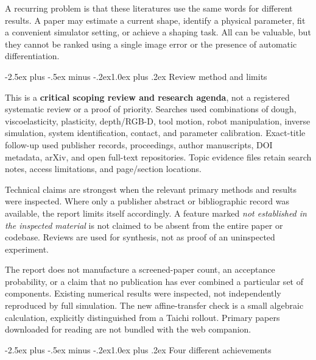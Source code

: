 \documentclass[
  11pt,
]{article}
\makeatletter
\renewcommand\subsection{\needspace{5\baselineskip}\@startsection{subsection}{2}{\z@}%
  {-2.5ex plus -.5ex minus -.2ex}{1.0ex plus .2ex}%
  {\normalfont\sffamily\large\bfseries\color{accent}}}
\makeatother
\begin{document}
A recurring problem is that these literatures use the same words for
different results. A paper may estimate a current shape, identify a
physical parameter, fit a convenient simulator setting, or achieve a
shaping task. All can be valuable, but they cannot be ranked using a
single image error or the presence of automatic differentiation.

\subsection{Review method and limits}\label{review-method-and-limits}

This is a \textbf{critical scoping review and research agenda}, not a
registered systematic review or a proof of priority. Searches used
combinations of dough, viscoelasticity, plasticity, depth/RGB-D, tool
motion, robot manipulation, inverse simulation, system identification,
contact, and parameter calibration. Exact-title follow-up used publisher
records, proceedings, author manuscripts, DOI metadata, arXiv, and open
full-text repositories. Topic evidence files retain search notes, access
limitations, and page/section locations.

Technical claims are strongest when the relevant primary methods and
results were inspected. Where only a publisher abstract or bibliographic
record was available, the report limits itself accordingly. A feature
marked \emph{not established in the inspected material} is not claimed
to be absent from the entire paper or codebase. Reviews are used for
synthesis, not as proof of an uninspected experiment.

The report does not manufacture a screened-paper count, an acceptance
probability, or a claim that no publication has ever combined a
particular set of components. Existing numerical results were inspected,
not independently reproduced by full simulation. The new affine-transfer
check is a small algebraic calculation, explicitly distinguished from a
Taichi rollout. Primary papers downloaded for reading are not bundled
with the web companion.

\subsection{Four different
achievements}\label{four-different-achievements}
\end{document}
